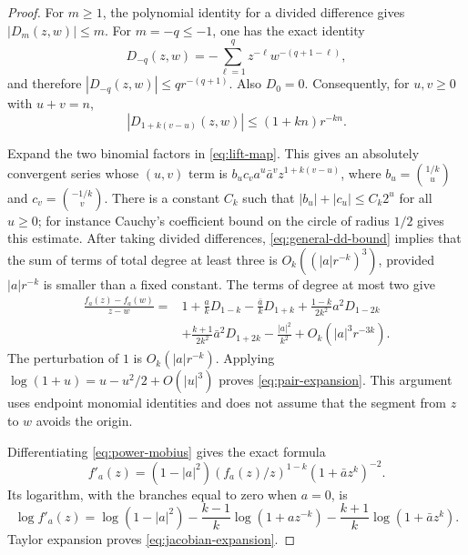 \documentclass[11pt,a4paper]{article}
\numberwithin{equation}{section}
\theoremstyle{definition}
\theoremstyle{remark}
\begin{document}
\begin{proof}
For $m\geq1$, the polynomial identity for a divided difference gives
$|D_m(z,w)|\leq m$. For $m=-q\leq-1$, one has the exact identity
\[
 D_{-q}(z,w)=-\sum_{\ell=1}^q z^{-\ell}w^{-(q+1-\ell)},
\]
and therefore $|D_{-q}(z,w)|\leq q r^{-(q+1)}$. Also $D_0=0$.
Consequently, for $u,v\geq0$ with $u+v=n$,
\begin{equation}
 |D_{1+k(v-u)}(z,w)|\leq(1+kn)r^{-kn}.
 \label{eq:general-dd-bound}
\end{equation}

Expand the two binomial factors in \eqref{eq:lift-map}. This gives an
absolutely convergent series whose $(u,v)$ term is
$b_u c_v a^u\bar a^v z^{1+k(v-u)}$, where
$b_u=\binom{1/k}{u}$ and $c_v=\binom{-1/k}{v}$.
There is a constant $C_k$ such that $|b_u|+|c_u|\leq C_k2^u$ for all
$u\geq0$; for instance Cauchy's coefficient bound on the circle of
radius $1/2$ gives this estimate. After taking divided differences,
\eqref{eq:general-dd-bound} implies that the sum of terms of total
degree at least three is $O_k((|a|r^{-k})^3)$, provided $|a|r^{-k}$ is
smaller than a fixed constant. The terms of degree at most two give
\begin{align*}
 \frac{f_a(z)-f_a(w)}{z-w}
 ={}&1+\frac{a}{k}D_{1-k}-\frac{\bar a}{k}D_{1+k}
 +\frac{1-k}{2k^2}a^2D_{1-2k}\\
 &+\frac{k+1}{2k^2}\bar a^2D_{1+2k}
 -\frac{|a|^2}{k^2}+O_k(|a|^3r^{-3k}).
\end{align*}
The perturbation of $1$ is $O_k(|a|r^{-k})$. Applying
$\log(1+u)=u-u^2/2+O(|u|^3)$ proves \eqref{eq:pair-expansion}.
This argument uses endpoint monomial identities and does not assume that
the segment from $z$ to $w$ avoids the origin.

Differentiating \eqref{eq:power-mobius} gives the exact formula
\[
 f'_a(z)=(1-|a|^2)(f_a(z)/z)^{1-k}(1+\bar a z^k)^{-2}.
\]
Its logarithm, with the branches equal to zero when $a=0$, is
\[
 \log f'_a(z)=\log(1-|a|^2)
 -\frac{k-1}{k}\log(1+a z^{-k})
 -\frac{k+1}{k}\log(1+\bar a z^k).
\]
Taylor expansion proves \eqref{eq:jacobian-expansion}.
\end{proof}
\end{document}
